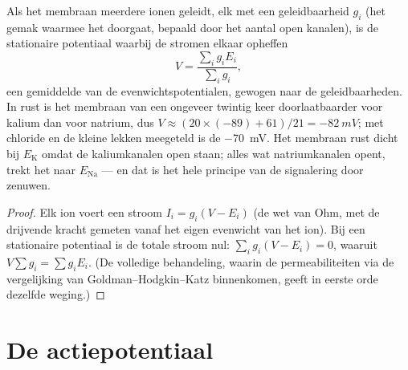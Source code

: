 \begin{theorem}\label{thm:b2:neurons-synapses:chord}
Als het membraan meerdere ionen geleidt, elk met een geleidbaarheid $g_i$
(het gemak waarmee het doorgaat, bepaald door het aantal open kanalen),
is de stationaire potentiaal waarbij de stromen elkaar opheffen
\[
V = \frac{\sum_i g_i E_i}{\sum_i g_i},
\]
een gemiddelde van de evenwichtspotentialen, gewogen naar de
geleidbaarheden. In rust is het membraan van een  ongeveer twintig keer
doorlaatbaarder voor kalium dan voor natrium, dus $V \approx (20\times(-89) +
61)/21 = \qty{-82}{mV}$; met chloride en de kleine lekken meegeteld is de
 \qty{-70}{mV}. Het membraan rust dicht bij $E_{\mathrm K}$
omdat de kaliumkanalen open staan; alles wat natriumkanalen opent, trekt het
naar $E_{\mathrm{Na}}$ --- en dat is het hele principe van de signalering
door zenuwen.
\end{theorem}
\begin{proof}
Elk ion voert een stroom $I_i = g_i(V - E_i)$ (de wet van Ohm, met de
drijvende kracht gemeten vanaf het eigen evenwicht van het ion). Bij een
stationaire potentiaal is de totale stroom nul: $\sum_i g_i(V - E_i) =
0$, waaruit $V\sum g_i = \sum g_iE_i$. (De volledige behandeling, waarin
de permeabiliteiten via de vergelijking van Goldman--Hodgkin--Katz
binnenkomen, geeft in eerste orde dezelfde weging.)
\end{proof}

\section{De actiepotentiaal}

